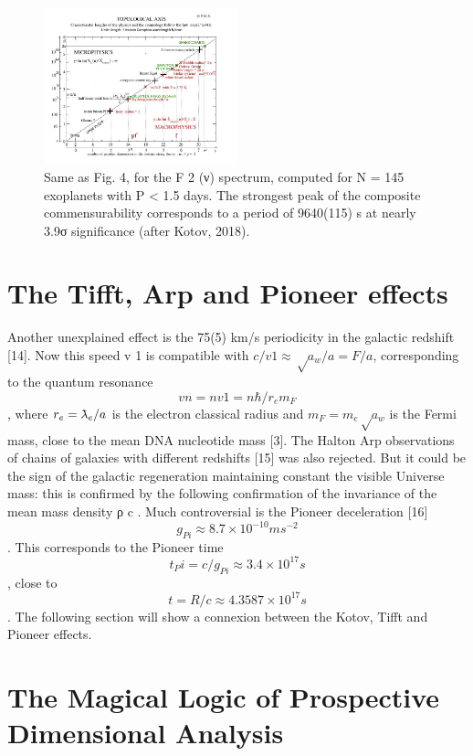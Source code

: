 \begin{figure}
\centering
\includegraphics[width=0.5\textwidth]{./figures/figure}
\caption{Same as Fig. 4, for the F 2 (ν) spectrum, computed for N = 145 exoplanets with P < 1.5
days. The strongest peak of the composite commensurability corresponds to a period of 9640(115) s
at nearly 3.9σ significance (after Kotov, 2018).}
\label{fig:figure_label}
\end{figure}


\section {The Tifft, Arp and Pioneer effects}

Another unexplained effect is the 75(5) km/s periodicity in the galactic redshift [14]. Now this
speed v 1 is compatible with $c/v 1 ≈ √a_{w} /a = F/a$, corresponding to the quantum resonance $$v n = nv 1 =n\hbar /r_{e} m_{F} $$, where $r_{e} = \lambdabar_{e} /a$ is the electron classical radius and $m_{F} = m_{e} √a_{w}$ is the Fermi mass, close to the mean DNA nucleotide mass [3].
The Halton Arp observations of chains of galaxies with different redshifts [15] was also
rejected. But it could be the sign of the galactic regeneration maintaining constant the visible
Universe mass: this is confirmed by the following confirmation of the invariance of the mean mass
density ρ c .
Much controversial is the Pioneer deceleration [16] $$g_{Pi} ≈ 8.7 \times 10^{-10} ms^{-2}$$ . This corresponds to
the Pioneer time $$t_Pi = c/g_{Pi} ≈ 3.4 \times 10^{17} s$$, close to $$t = R/c ≈ 4.3587 \times 10^{17} s$$. The following section will show a connexion between the Kotov, Tifft and Pioneer effects.

\section {The Magical Logic of Prospective Dimensional Analysis}

